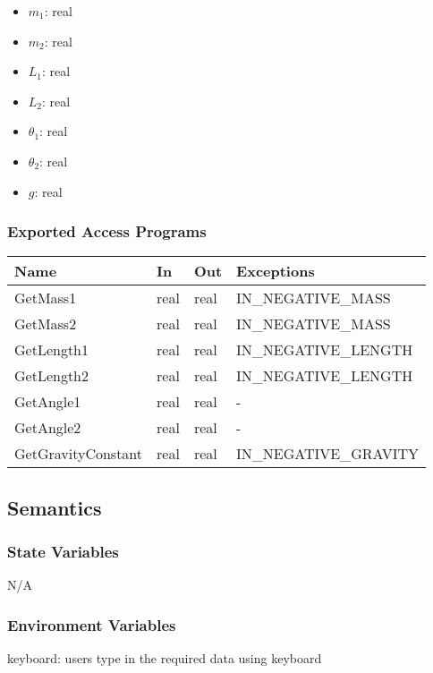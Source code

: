 \documentclass[12pt, titlepage]{article}
\begin{document}
\begin{itemize}
  \item $m_1$: real
  \item $m_2$: real
  \item $L_1$: real
  \item $L_2$: real
  \item $\theta_1$: real
  \item $\theta_2$: real
  \item $g$: real
\end{itemize}

\subsubsection{Exported Access Programs}

\begin{center}
\begin{tabular}{p{4cm} p{2cm} p{2cm} p{6cm}}
\hline
\textbf{Name} & \textbf{In} & \textbf{Out} & \textbf{Exceptions} \\
\hline
GetMass1 & real & real & IN\_NEGATIVE\_MASS \\
\hline
GetMass2 & real & real & IN\_NEGATIVE\_MASS \\
\hline
GetLength1 & real & real & IN\_NEGATIVE\_LENGTH \\
\hline
GetLength2 & real & real & IN\_NEGATIVE\_LENGTH \\
\hline
GetAngle1 & real & real & -\\
\hline
GetAngle2 & real & real & - \\
\hline
GetGravityConstant & real & real & IN\_NEGATIVE\_GRAVITY \\
\hline
\end{tabular}
\end{center}

\subsection{Semantics}

\subsubsection{State Variables}
N/A

\subsubsection{Environment Variables}
keyboard: users type in the required data using keyboard
\end{document}

